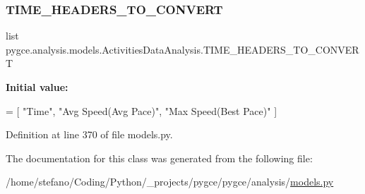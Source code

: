\subsubsection{\texorpdfstring{T\+I\+M\+E\+\_\+\+H\+E\+A\+D\+E\+R\+S\+\_\+\+T\+O\+\_\+\+C\+O\+N\+V\+E\+RT}{TIME\_HEADERS\_TO\_CONVERT}}
{\footnotesize\ttfamily list pygce.\+analysis.\+models.\+Activities\+Data\+Analysis.\+T\+I\+M\+E\+\_\+\+H\+E\+A\+D\+E\+R\+S\+\_\+\+T\+O\+\_\+\+C\+O\+N\+V\+E\+RT\hspace{0.3cm}{\ttfamily [static]}}

{\bfseries Initial value\+:}
\begin{DoxyCode}
=  [
        \textcolor{stringliteral}{"Time"},
        \textcolor{stringliteral}{"Avg Speed(Avg Pace)"},
        \textcolor{stringliteral}{"Max Speed(Best Pace)"}
    ]
\end{DoxyCode}


Definition at line 370 of file models.\+py.



The documentation for this class was generated from the following file\+:\begin{DoxyCompactItemize}
\item 
/home/stefano/\+Coding/\+Python/\+\_\+projects/pygce/pygce/analysis/\hyperlink{models_8py}{models.\+py}\end{DoxyCompactItemize}
